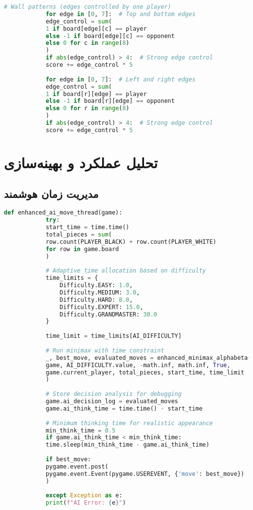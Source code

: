 \documentclass[12pt]{article}
\newenvironment{ltrcode}{\lr\bgroup}{\egroup}
\begin{document}
	\begin{ltrcode}
		\begin{lstlisting}[language=Python, caption=Wall Control Pattern Analysis]
			# Wall patterns (edges controlled by one player)
			for edge in [0, 7]:  # Top and bottom edges
			edge_control = sum(
			1 if board[edge][c] == player 
			else -1 if board[edge][c] == opponent 
			else 0 for c in range(8)
			)
			if abs(edge_control) > 4:  # Strong edge control
			score += edge_control * 5
			
			for edge in [0, 7]:  # Left and right edges
			edge_control = sum(
			1 if board[r][edge] == player 
			else -1 if board[r][edge] == opponent 
			else 0 for r in range(8)
			)
			if abs(edge_control) > 4:  # Strong edge control
			score += edge_control * 5
		\end{lstlisting}
	\end{ltrcode}
	
	\section{تحلیل عملکرد و بهینه‌سازی}
	
	\subsection{مدیریت زمان هوشمند}
	
	\begin{ltrcode}
		\begin{lstlisting}[language=Python, caption=Intelligent Time Management]
			def enhanced_ai_move_thread(game):
			try:
			start_time = time.time()
			total_pieces = sum(
			row.count(PLAYER_BLACK) + row.count(PLAYER_WHITE) 
			for row in game.board
			)
			
			# Adaptive time allocation based on difficulty
			time_limits = {
				Difficulty.EASY: 1.0,
				Difficulty.MEDIUM: 3.0,
				Difficulty.HARD: 8.0,
				Difficulty.EXPERT: 15.0,
				Difficulty.GRANDMASTER: 30.0
			}
			
			time_limit = time_limits[AI_DIFFICULTY]
			
			# Run minimax with time constraint
			_, best_move, evaluated_moves = enhanced_minimax_alphabeta(
			game, AI_DIFFICULTY.value, -math.inf, math.inf, True, 
			game.current_player, total_pieces, start_time, time_limit
			)
			
			# Store decision analysis for debugging
			game.ai_decision_log = evaluated_moves
			game.ai_think_time = time.time() - start_time
			
			# Minimum thinking time for realistic appearance
			min_think_time = 0.5
			if game.ai_think_time < min_think_time:
			time.sleep(min_think_time - game.ai_think_time)
			
			if best_move:
			pygame.event.post(
			pygame.event.Event(pygame.USEREVENT, {'move': best_move})
			)
			
			except Exception as e:
			print(f"AI Error: {e}")
		\end{lstlisting}
	\end{ltrcode}
	
\end{document}
